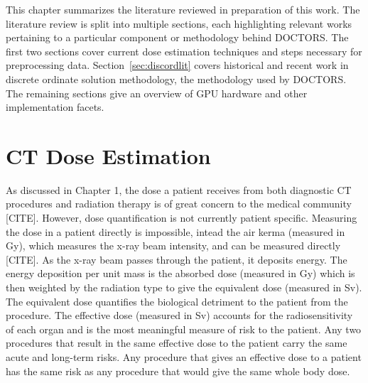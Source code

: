 
This chapter summarizes the literature reviewed in preparation of this work. The literature review is split into multiple sections, each highlighting relevant works pertaining to a particular component or methodology behind DOCTORS. The first two sections cover current dose estimation techniques and steps necessary for preprocessing data. Section~\ref{sec:discordlit} covers historical and recent work in discrete ordinate solution methodology, the methodology used by DOCTORS. The remaining sections give an overview of GPU hardware and other implementation facets.

\section{CT Dose Estimation}
As discussed in Chapter 1, the dose a patient receives from both diagnostic CT procedures and radiation therapy is of great concern to the medical community [CITE]. However, dose quantification is not currently patient specific. Measuring the dose in a patient directly is impossible, intead the air kerma (measured in Gy), which measures the x-ray beam intensity, and can be measured directly [CITE]. As the x-ray beam passes through the patient, it deposits energy. The energy deposition per unit mass is the absorbed dose (measured in Gy) which is then weighted by the radiation type to give the equivalent dose (measured in Sv). The equivalent dose quantifies the biological detriment to the patient from the procedure. The effective dose (measured in Sv) accounts for the radiosensitivity of each organ and is the most meaningful measure of risk to the patient. Any two procedures that result in the same effective dose to the patient carry the same acute and long-term risks. Any procedure that gives an effective dose to a patient has the same risk as any procedure that would give the same whole body dose.

